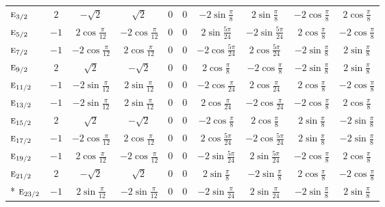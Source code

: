 \documentclass[10pt,a4paper]{article}
\numberwithin{equation}{section}
\newcommand{\irr}[1]{\text{\normalfont\scshape #1}}
\begin{document}
{{\begin{longtable}{@{}lccccccccc@{}}
$\irr{e}_{3/2}$ & $2$ & $-\sqrt{2}$ & $\sqrt{2}$ & $0$ & $0$ & $-2\sin\tfrac{\pi}{8}$ & $2\sin\tfrac{\pi}{8}$ & $-2\cos\tfrac{\pi}{8}$ & $2\cos\tfrac{\pi}{8}$\\
$\irr{e}_{5/2}$ & $-1$ & $2\cos\tfrac{\pi}{12}$ & $-2\cos\tfrac{\pi}{12}$ & $0$ & $0$ & $2\sin\tfrac{5\pi}{24}$ & $-2\sin\tfrac{5\pi}{24}$ & $2\cos\tfrac{\pi}{8}$ & $-2\cos\tfrac{\pi}{8}$\\
$\irr{e}_{7/2}$ & $-1$ & $-2\cos\tfrac{\pi}{12}$ & $2\cos\tfrac{\pi}{12}$ & $0$ & $0$ & $-2\cos\tfrac{5\pi}{24}$ & $2\cos\tfrac{5\pi}{24}$ & $-2\sin\tfrac{\pi}{8}$ & $2\sin\tfrac{\pi}{8}$\\
$\irr{e}_{9/2}$ & $2$ & $\sqrt{2}$ & $-\sqrt{2}$ & $0$ & $0$ & $2\cos\tfrac{\pi}{8}$ & $-2\cos\tfrac{\pi}{8}$ & $-2\sin\tfrac{\pi}{8}$ & $2\sin\tfrac{\pi}{8}$\\
$\irr{e}_{11/2}$ & $-1$ & $-2\sin\tfrac{\pi}{12}$ & $2\sin\tfrac{\pi}{12}$ & $0$ & $0$ & $-2\cos\tfrac{\pi}{24}$ & $2\cos\tfrac{\pi}{24}$ & $2\cos\tfrac{\pi}{8}$ & $-2\cos\tfrac{\pi}{8}$\\
$\irr{e}_{13/2}$ & $-1$ & $-2\sin\tfrac{\pi}{12}$ & $2\sin\tfrac{\pi}{12}$ & $0$ & $0$ & $2\cos\tfrac{\pi}{24}$ & $-2\cos\tfrac{\pi}{24}$ & $-2\cos\tfrac{\pi}{8}$ & $2\cos\tfrac{\pi}{8}$\\
$\irr{e}_{15/2}$ & $2$ & $\sqrt{2}$ & $-\sqrt{2}$ & $0$ & $0$ & $-2\cos\tfrac{\pi}{8}$ & $2\cos\tfrac{\pi}{8}$ & $2\sin\tfrac{\pi}{8}$ & $-2\sin\tfrac{\pi}{8}$\\
$\irr{e}_{17/2}$ & $-1$ & $-2\cos\tfrac{\pi}{12}$ & $2\cos\tfrac{\pi}{12}$ & $0$ & $0$ & $2\cos\tfrac{5\pi}{24}$ & $-2\cos\tfrac{5\pi}{24}$ & $2\sin\tfrac{\pi}{8}$ & $-2\sin\tfrac{\pi}{8}$\\
$\irr{e}_{19/2}$ & $-1$ & $2\cos\tfrac{\pi}{12}$ & $-2\cos\tfrac{\pi}{12}$ & $0$ & $0$ & $-2\sin\tfrac{5\pi}{24}$ & $2\sin\tfrac{5\pi}{24}$ & $-2\cos\tfrac{\pi}{8}$ & $2\cos\tfrac{\pi}{8}$\\
$\irr{e}_{21/2}$ & $2$ & $-\sqrt{2}$ & $\sqrt{2}$ & $0$ & $0$ & $2\sin\tfrac{\pi}{8}$ & $-2\sin\tfrac{\pi}{8}$ & $2\cos\tfrac{\pi}{8}$ & $-2\cos\tfrac{\pi}{8}$\\*
$\irr{e}_{23/2}$ & $-1$ & $2\sin\tfrac{\pi}{12}$ & $-2\sin\tfrac{\pi}{12}$ & $0$ & $0$ & $-2\sin\tfrac{\pi}{24}$ & $2\sin\tfrac{\pi}{24}$ & $-2\sin\tfrac{\pi}{8}$ & $2\sin\tfrac{\pi}{8}$\\
\bottomrule\end{longtable}}}
\end{document}
